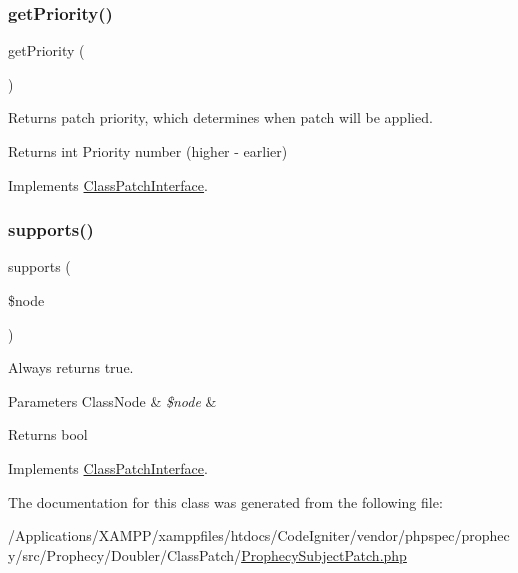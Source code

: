 \subsubsection{\texorpdfstring{get\+Priority()}{getPriority()}}
{\footnotesize\ttfamily get\+Priority (\begin{DoxyParamCaption}{ }\end{DoxyParamCaption})}

Returns patch priority, which determines when patch will be applied.

\begin{DoxyReturn}{Returns}
int Priority number (higher -\/ earlier) 
\end{DoxyReturn}


Implements \mbox{\hyperlink{interface_prophecy_1_1_doubler_1_1_class_patch_1_1_class_patch_interface_a1e7a3c168dcd0901a0d2669c67575b55}{Class\+Patch\+Interface}}.

\mbox{\label{class_prophecy_1_1_doubler_1_1_class_patch_1_1_prophecy_subject_patch_a99b2455ac194faf79aff042c55719ac2}} 
\subsubsection{\texorpdfstring{supports()}{supports()}}
{\footnotesize\ttfamily supports (\begin{DoxyParamCaption}\item[{\mbox{\hyperlink{class_prophecy_1_1_doubler_1_1_generator_1_1_node_1_1_class_node}{Class\+Node}}}]{\$node }\end{DoxyParamCaption})}

Always returns true.


\begin{DoxyParams}[1]{Parameters}
Class\+Node & {\em \$node} & \\
\hline
\end{DoxyParams}
\begin{DoxyReturn}{Returns}
bool 
\end{DoxyReturn}


Implements \mbox{\hyperlink{interface_prophecy_1_1_doubler_1_1_class_patch_1_1_class_patch_interface_a99b2455ac194faf79aff042c55719ac2}{Class\+Patch\+Interface}}.



The documentation for this class was generated from the following file\+:\begin{DoxyCompactItemize}
\item 
/\+Applications/\+X\+A\+M\+P\+P/xamppfiles/htdocs/\+Code\+Igniter/vendor/phpspec/prophecy/src/\+Prophecy/\+Doubler/\+Class\+Patch/\mbox{\hyperlink{_prophecy_subject_patch_8php}{Prophecy\+Subject\+Patch.\+php}}\end{DoxyCompactItemize}
